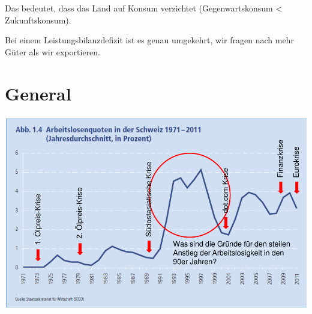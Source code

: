 \documentclass[11pt,twoside,landscape]{article}
\begin{document}
\begin{multicols}{3}
Das bedeutet, dass das Land auf Konsum verzichtet (Gegenwartskonsum < Zukunftskonsum).

Bei einem Leistungsbilanzdefizit ist es genau umgekehrt, wir fragen nach mehr Güter als wir exportieren.

\section{General}
\label{sec:orgeed3f62}

{
\begin{center}
\includegraphics[width=.9\linewidth]{img/wirtschaftskrisen.png}
\end{center}
\label{fig:wirtschaftskrisen}
}

\end{multicols}
\end{document}

